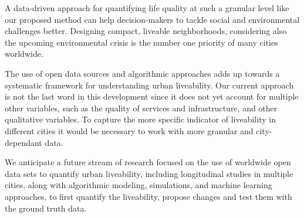 A data-driven approach for quantifying life quality at such a granular level like our proposed method can help decision-makers to tackle social and environmental challenges better. Designing compact, liveable neighborhoods, considering also the upcoming environmental crisis is the number one priority of many cities worldwide.

The use of open data sources and algorithmic approaches adds up towards a systematic framework for understanding urban liveability. Our current approach is not the last word in this development since it does not yet account for multiple other variables, such as the quality of services and infrastructure, and other qualitative variables. To capture the more specific indicator of liveability in different cities it would be necessary to work with more granular and city-dependant data.

We anticipate a future stream of research focused on the use of worldwide open data sets to quantify urban liveability, including longitudinal studies in multiple cities, along with algorithmic modeling, simulations, and machine learning approaches, to first quantify the liveability, propose changes and test them with the ground truth data.
